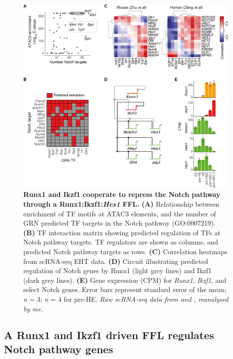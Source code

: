 \begin{figure}[!t]
    \centering
    \includegraphics[width=\textwidth,height=\textheight,keepaspectratio]{figures/chapter3/ch3_runx1-ikzf1-notch.png}
    \caption[{Runx1 and Ikzf1 cooperate to repress the Notch pathway through a Runx1:Ikzf1:\textit{Hes1} FFL.}]
    {\textbf{Runx1 and Ikzf1 cooperate to repress the Notch pathway through a Runx1:Ikzf1:\textit{Hes1} FFL.} 
    \textbf{(A)} Relationship between enrichment of TF motifs at ATAC3 elements, and the number of GRN predicted TF targets in the Notch pathway (GO:0007219). 
    \textbf{(B)} TF interaction matrix showing predicted regulation of TFs at Notch pathway targets. TF regulators are shown as columns, and predicted Notch pathway targets as rows. 
    \textbf{(C)} Correlation heatmaps from scRNA-seq EHT data. 
    \textbf{(D)} Circuit illustrating predicted regulation of Notch genes by Runx1 (light grey lines) and Ikzf1 (dark grey lines). 
    \textbf{(E)} Gene expression (CPM) for \textit{Runx1}, \textit{Ikzf1}, and select Notch genes. Error bars represent standard error of the mean; \textit{n} = 3; \textit{n} = 4 for pre-HE. 
    \textit{Raw scRNA-seq data from \cite{zhu_developmental_2020} and \cite{zeng_tracing_2019}, reanalysed by me.} 
    }
    \label{fig:ch3_runx1-ikzf1-notch}
\end{figure}

\subsection{\label{ch3:notch}A Runx1 and Ikzf1 driven FFL regulates Notch pathway genes}

